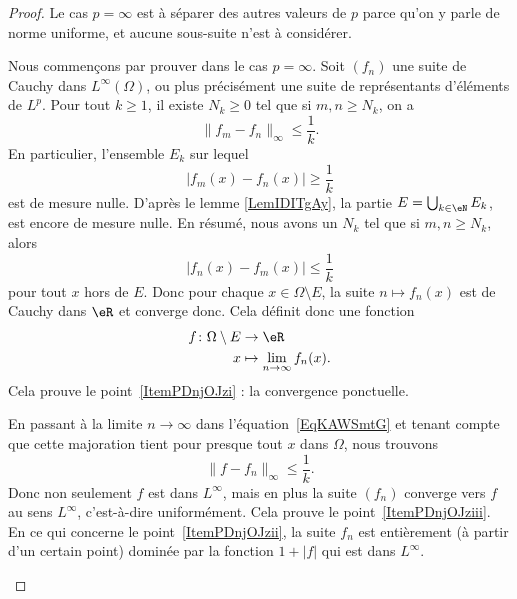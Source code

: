 \begin{proof}
	Le cas \( p=\infty\) est à séparer des autres valeurs de \( p\) parce qu'on y parle de norme uniforme, et aucune sous-suite n'est à considérer.
	\begin{subproof}
		\spitem[Cas \( p=\infty\).]
		Nous commençons par prouver dans le cas \( p=\infty\). Soit \( (f_n)\) une suite de Cauchy dans \( L^{\infty}(\Omega)\), ou plus précisément une suite de représentants d'éléments de \( L^p\). Pour tout \( k\geq 1\), il existe \( N_k\geq 0\) tel que si \( m,n\geq N_k\), on a
		\begin{equation}
			\| f_m-f_n \|_{\infty}\leq \frac{1}{ k }.
		\end{equation}
		En particulier, l'ensemble \( E_k\) sur lequel
		\begin{equation}
			| f_m(x)-f_n(x) |\geq\frac{1}{ k }
		\end{equation}
		est de mesure nulle. D'après le lemme \ref{LemIDITgAy}, la partie \( E=\bigcup_{k\in \eN}E_k\), est encore de mesure nulle. En  résumé, nous avons un \( N_k\) tel que si \( m,n\geq N_k\), alors
		\begin{equation}    \label{EqKAWSmtG}
			| f_n(x)-f_m(x) |\leq \frac{1}{ k }
		\end{equation}
		pour tout \( x\) hors de \( E\). Donc pour chaque \( x\in\Omega\setminus E\), la suite \( n\mapsto f_n(x)\) est de Cauchy dans \( \eR\) et converge donc. Cela définit donc une fonction
		\begin{equation}
			\begin{aligned}
				f\colon \Omega\setminus E & \to \eR                            \\
				x                         & \mapsto \lim_{n\to \infty} f_n(x).
			\end{aligned}
		\end{equation}
		Cela prouve le point~\ref{ItemPDnjOJzi} : la convergence ponctuelle.

		En passant à la limite \( n\to \infty\) dans l'équation~\eqref{EqKAWSmtG} et tenant compte que cette majoration tient pour presque tout \( x\) dans \( \Omega\), nous trouvons
		\begin{equation}
			\| f-f_n \|_{\infty}\leq \frac{1}{ k }.
		\end{equation}
		Donc non seulement \( f\) est dans \( L^{\infty}\), mais en plus la suite \( (f_n)\) converge vers \( f\) au sens \( L^{\infty}\), c'est-à-dire uniformément. Cela prouve le point~\ref{ItemPDnjOJziii}. En ce qui concerne le point~\ref{ItemPDnjOJzii}, la suite \( f_n\) est entièrement (à partir d'un certain point) dominée par la fonction \( 1+| f |\) qui est dans \( L^{\infty}\).


\end{subproof}
\end{proof}
